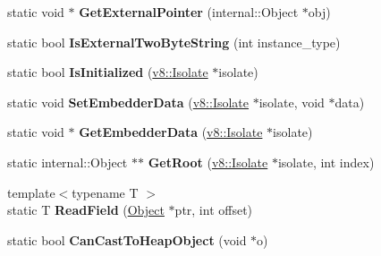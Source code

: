 \begin{DoxyCompactItemize}
\item 
\hypertarget{classv8_1_1internal_1_1_internals_a77c94e6b4e68d6c73dec78d81a0c219a}{}static void $\ast$ {\bfseries Get\+External\+Pointer} (internal\+::\+Object $\ast$obj)\label{classv8_1_1internal_1_1_internals_a77c94e6b4e68d6c73dec78d81a0c219a}

\item 
\hypertarget{classv8_1_1internal_1_1_internals_a072f010fdf69ea2c0d7145190221410f}{}static bool {\bfseries Is\+External\+Two\+Byte\+String} (int instance\+\_\+type)\label{classv8_1_1internal_1_1_internals_a072f010fdf69ea2c0d7145190221410f}

\item 
\hypertarget{classv8_1_1internal_1_1_internals_a3c8d98c88d8920ba067ab69551738b11}{}static bool {\bfseries Is\+Initialized} (\hyperlink{classv8_1_1_isolate}{v8\+::\+Isolate} $\ast$isolate)\label{classv8_1_1internal_1_1_internals_a3c8d98c88d8920ba067ab69551738b11}

\item 
\hypertarget{classv8_1_1internal_1_1_internals_a7e4b3be6326734f1d508ff9ef9c0056f}{}static void {\bfseries Set\+Embedder\+Data} (\hyperlink{classv8_1_1_isolate}{v8\+::\+Isolate} $\ast$isolate, void $\ast$data)\label{classv8_1_1internal_1_1_internals_a7e4b3be6326734f1d508ff9ef9c0056f}

\item 
\hypertarget{classv8_1_1internal_1_1_internals_a35dfa6763e847c4d8cac749ccd575d61}{}static void $\ast$ {\bfseries Get\+Embedder\+Data} (\hyperlink{classv8_1_1_isolate}{v8\+::\+Isolate} $\ast$isolate)\label{classv8_1_1internal_1_1_internals_a35dfa6763e847c4d8cac749ccd575d61}

\item 
\hypertarget{classv8_1_1internal_1_1_internals_a0162db42b591f1f0f9f54f32211b09a2}{}static internal\+::\+Object $\ast$$\ast$ {\bfseries Get\+Root} (\hyperlink{classv8_1_1_isolate}{v8\+::\+Isolate} $\ast$isolate, int index)\label{classv8_1_1internal_1_1_internals_a0162db42b591f1f0f9f54f32211b09a2}

\item 
\hypertarget{classv8_1_1internal_1_1_internals_a457c0c73d5fdf4cc577133edce0ce37b}{}{\footnotesize template$<$typename T $>$ }\\static T {\bfseries Read\+Field} (\hyperlink{classv8_1_1_object}{Object} $\ast$ptr, int offset)\label{classv8_1_1internal_1_1_internals_a457c0c73d5fdf4cc577133edce0ce37b}

\item 
\hypertarget{classv8_1_1internal_1_1_internals_aba843dd4a6fc9cd583ade29cd984add2}{}static bool {\bfseries Can\+Cast\+To\+Heap\+Object} (void $\ast$o)\label{classv8_1_1internal_1_1_internals_aba843dd4a6fc9cd583ade29cd984add2}


\end{DoxyCompactItemize}

